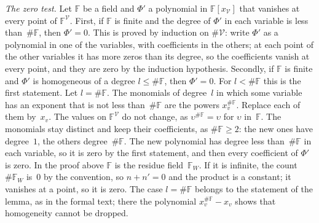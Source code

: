 \documentclass[11pt,a4paper]{article}
\makeatletter
\newcommand{\lean}[1]{\csname LN@#1\endcsname}
\newcommand{\m}[1]{\mbox{$#1$}}        %
\newcommand{\leantag}{{\sffamily\bfseries\fontsize{6.3}{8}\selectfont\color{leancol}\addfontfeatures{LetterSpace=7}LEAN}}
\newcommand{\leanline}[1]{\par\nopagebreak\vspace{-2.5pt}{\fontsize{8.9}{12.4}\selectfont\color{inksoft}\raggedright
  \noindent\llap{\leantag\hspace{9pt}}#1\par}\vspace{1pt}}
\theoremstyle{plainx}
\theoremstyle{uprightx}
\renewenvironment{proof}[1][Proof]{\par\pushQED{\qed}\normalfont\topsep0pt\partopsep0pt
  \trivlist\item[\hskip\labelsep\itshape #1.]\ignorespaces}{\popQED\endtrivlist\@endpefalse}
\newcommand{\FF}{\mathbb{F}}
\newcommand{\cV}{\mathcal{V}}
\makeatother
\begin{document}
\begin{proof}
\emph{The zero test.} Let $\FF$ be a field and \m{\Phi'} a polynomial in \m{\FF[x_{\cV}]} that vanishes at every
point of \m{\FF^{\cV}}. First, if $\FF$ is finite and the degree of \m{\Phi'} in each variable is less
than~\m{\#\FF}, then \m{\Phi'=0}. This is proved by induction on \m{\#\cV}: write \m{\Phi'} as a polynomial in one
of the variables, with coefficients in the others; at each point of the other variables it has more zeros than
its degree, so the coefficients vanish at every point, and they are zero by the induction hypothesis. Secondly,
if $\FF$ is finite and \m{\Phi'} is homogeneous of a degree \m{l\le\#\FF}, then \m{\Phi'=0}. For \m{l<\#\FF} this is
the first statement. Let \m{l=\#\FF}. The monomials of degree~$l$ in which some variable has an exponent that
is not less than~\m{\#\FF} are the powers \m{x_v^{\#\FF}}. Replace each of them by~\m{x_v}. The values on
\m{\FF^{\cV}} do not change, as \m{\upsilon^{\#\FF}=\upsilon} for $\upsilon$ in~$\FF$. The monomials stay distinct and keep
their coefficients, as \m{\#\FF\ge2}: the new ones have degree~$1$, the others degree~\m{\#\FF}. The new
polynomial has degree less than~\m{\#\FF} in each variable, so it is zero by the first statement, and then every
coefficient of \m{\Phi'} is zero. In the proof above $\FF$ is the residue field~\m{\FF_W}. If it is infinite, the
count \m{\#\FF_W} is~$0$ by the convention, so \m{n+n'=0} and the product is a constant; it vanishes at a point,
so it is zero. The case \m{l=\#\FF} belongs to the statement of the lemma, as in the formal text; there the
polynomial \m{x_v^{\#\FF}-x_v} shows that homogeneity cannot be dropped.
\end{proof}
\leanline{\lean{zariski}}
\end{document}
